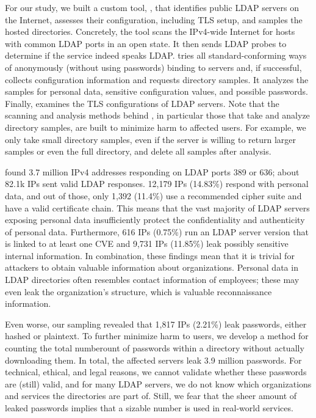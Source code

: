 For our study, we built a custom tool, \NAME, that identifies public \acrshort{LDAP} servers on the Internet, assesses their configuration, including TLS setup, and samples the hosted directories. Concretely, the tool scans the IPv4-wide Internet for hosts with common LDAP ports in an open state. It then sends LDAP probes to determine if the service indeed speaks \acrshort{LDAP}. \NAME{} tries all standard-conforming ways of anonymously (without using passwords) binding to servers and, if successful, collects configuration information and requests directory samples. It analyzes the samples for personal data, sensitive configuration values, and possible passwords. Finally, \NAME{} examines the TLS configurations of LDAP servers. Note that the scanning and analysis methods behind \NAME, in particular those that take and analyze directory samples, are built to minimize harm to affected users. For example, we only take small directory samples, even if the server is willing to return larger samples or even the full directory, and delete all samples after analysis.

\NAME{} found 3.7 million IPv4 addresses responding on \acrshort{LDAP} ports 389 or 636; about 
82.1k IPs sent valid \acrshort{LDAP} responses. 12,179 IPs (14.83\%)
respond with personal data, and out of those, only 1,392 (11.4\%) use a recommended cipher suite and have a valid certificate chain. This means that the vast majority of \acrshort{LDAP} servers exposing personal data insufficiently protect the confidentiality and authenticity of personal data. Furthermore, 
616 IPs (0.75\%) run an \acrshort{LDAP} server version that is linked to at least one CVE and 
9,731 IPs (11.85\%) leak possibly sensitive internal information. 
In combination, these findings mean that it is trivial for attackers to obtain valuable information about organizations. Personal data in \acrshort{LDAP} directories often resembles contact information of employees; these may even leak the organization's structure, which is valuable reconnaissance information.

Even worse, our sampling revealed that 
1,817 IPs (2.21\%) leak passwords, either hashed or plaintext. To further minimize harm to users, we develop a method for counting the total numberount of passwords within a directory without actually downloading them. In total, the affected servers leak 3.9 million passwords. For technical, ethical, and legal reasons, we cannot validate whether these passwords are (still) valid, and for many LDAP servers, we do not know which organizations and services the directories are part of. 
Still, we fear that the sheer amount of leaked passwords implies that a sizable number is used in real-world services.

